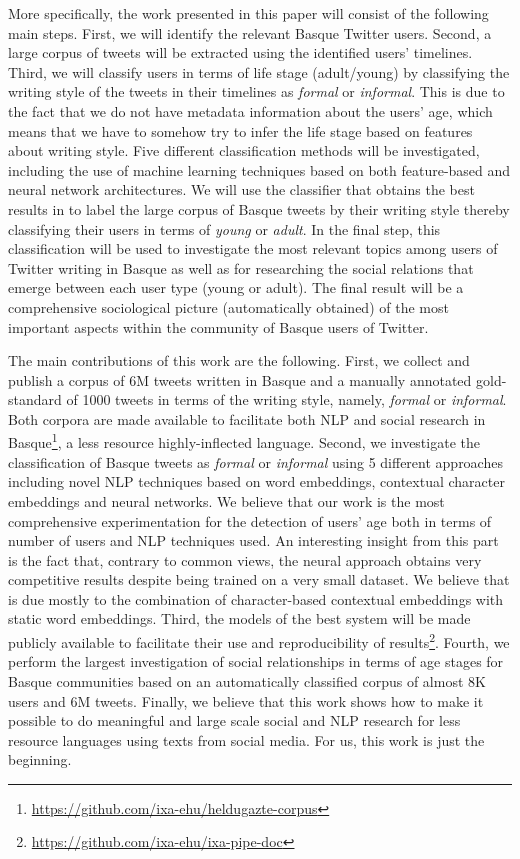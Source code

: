 \documentclass[information,article,submit,moreauthors,pdftex,10pt,a4paper]{Definitions/mdpi}
\begin{document}
More specifically, the work presented in this paper will consist of the following main steps. First, we will identify the relevant Basque Twitter users. Second, a large corpus of tweets will be extracted using the identified users' timelines. Third, we will classify users in terms of life stage (adult/young) by classifying the writing style of the tweets in their timelines as \emph{formal} or \emph{informal}. This is due to the fact that we do not have metadata information about the users' age, which means that we have to somehow try to infer the life stage based on features about writing style. Five different classification methods will be investigated, including the use of machine learning techniques based on both feature-based and neural network architectures. We will use the classifier that obtains the best results in to label the large corpus of Basque tweets by their writing style thereby classifying their users in terms of \emph{young} or \emph{adult}. In the final step, this classification will be used to investigate the most relevant topics among users of Twitter writing in Basque as well as for researching the social relations that emerge between each user type (young or adult). The final result will be a comprehensive sociological picture (automatically obtained) of the most important aspects within the community of Basque users of Twitter.

The main contributions of this work are the following. First, we collect and publish a corpus of 6M tweets written in Basque and a manually annotated gold-standard of 1000 tweets in terms of the writing style, namely, \emph{formal} or \emph{informal}. Both corpora are made available to facilitate both NLP and social research in Basque\footnote{\url{https://github.com/ixa-ehu/heldugazte-corpus}}, a less resource highly-inflected language. Second, we investigate the classification of Basque tweets as \emph{formal} or \emph{informal} using 5 different approaches including novel NLP techniques based on word embeddings, contextual character embeddings and neural networks. We believe that our work is the most comprehensive experimentation for the detection of users' age both in terms of number of users and NLP techniques used. An interesting insight from this part is the fact that, contrary to common views, the neural approach \cite{akbik2018contextual} obtains very competitive results despite being trained on a very small dataset. We believe that is due mostly to the combination of character-based contextual embeddings with static word embeddings. Third, the models of the best system will be made publicly available to facilitate their use and reproducibility of results\footnote{\url{https://github.com/ixa-ehu/ixa-pipe-doc}}. Fourth, we perform the largest investigation of social relationships in terms of age stages for Basque communities based on an automatically classified corpus of almost 8K users and 6M tweets. Finally, we believe that this work shows how to make it possible to do meaningful and large scale social and NLP research for less resource languages using texts from social media. For us, this work is just the beginning.
\end{document}
